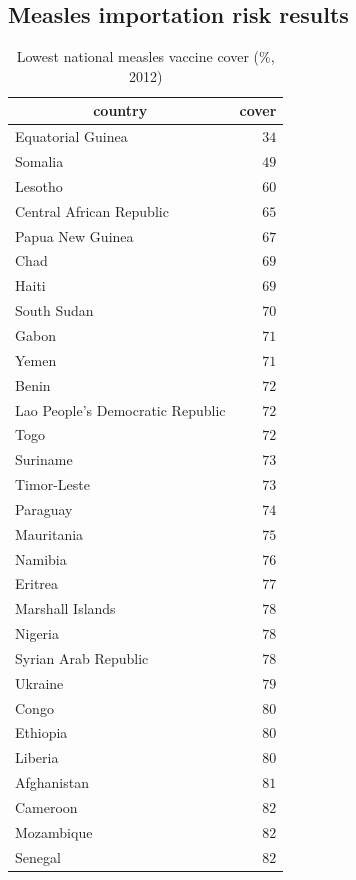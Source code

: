 \documentclass{article}
\begin{document}
\begin{itemize}
\subsection{Measles importation risk results}



\begin{table}
\caption{Lowest national measles vaccine cover (\%, 2012)}
\begin{center}
\begin{tabular}{lr}
\hline\hline
\multicolumn{1}{c}{country}&\multicolumn{1}{c}{cover}\tabularnewline
\hline
Equatorial Guinea&$34$\tabularnewline
Somalia&$49$\tabularnewline
Lesotho&$60$\tabularnewline
Central African Republic&$65$\tabularnewline
Papua New Guinea&$67$\tabularnewline
Chad&$69$\tabularnewline
Haiti&$69$\tabularnewline
South Sudan&$70$\tabularnewline
Gabon&$71$\tabularnewline
Yemen&$71$\tabularnewline
Benin&$72$\tabularnewline
Lao People's Democratic Republic&$72$\tabularnewline
Togo&$72$\tabularnewline
Suriname&$73$\tabularnewline
Timor-Leste&$73$\tabularnewline
Paraguay&$74$\tabularnewline
Mauritania&$75$\tabularnewline
Namibia&$76$\tabularnewline
Eritrea&$77$\tabularnewline
Marshall Islands&$78$\tabularnewline
Nigeria&$78$\tabularnewline
Syrian Arab Republic&$78$\tabularnewline
Ukraine&$79$\tabularnewline
Congo&$80$\tabularnewline
Ethiopia&$80$\tabularnewline
Liberia&$80$\tabularnewline
Afghanistan&$81$\tabularnewline
Cameroon&$82$\tabularnewline
Mozambique&$82$\tabularnewline
Senegal&$82$\tabularnewline
\hline
\end{tabular}\end{center}\label{table:cover12}
\end{table}


\end{itemize}
\end{document}
